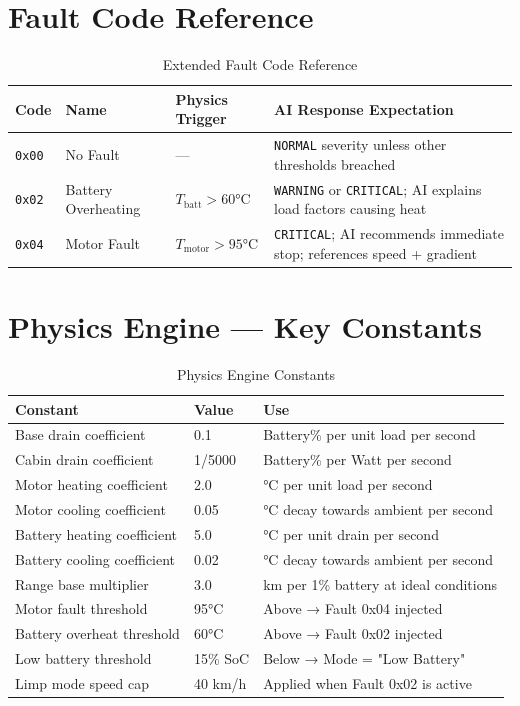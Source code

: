 \documentclass[12pt,a4paper]{report}
\begin{document}
\chapter{Fault Code Reference}

\begin{table}[H]
\centering
\caption{Extended Fault Code Reference}
\label{tab:faults-extended}
\begin{tabularx}{\textwidth}{C{2cm} L{3.5cm} L{3cm} X}
\toprule
\textbf{Code} & \textbf{Name} & \textbf{Physics Trigger} & \textbf{AI Response Expectation} \\
\midrule
\texttt{0x00} & No Fault & — & \texttt{NORMAL} severity unless other thresholds breached \\
\texttt{0x02} & Battery Overheating & $T_{\text{batt}} > 60$°C & \texttt{WARNING} or \texttt{CRITICAL}; AI explains load factors causing heat \\
\texttt{0x04} & Motor Fault & $T_{\text{motor}} > 95$°C & \texttt{CRITICAL}; AI recommends immediate stop; references speed + gradient \\
\bottomrule
\end{tabularx}
\end{table}

\chapter{Physics Engine — Key Constants}

\begin{table}[H]
\centering
\caption{Physics Engine Constants}
\label{tab:constants}
\begin{tabularx}{\textwidth}{L{4.5cm} C{3cm} X}
\toprule
\textbf{Constant} & \textbf{Value} & \textbf{Use} \\
\midrule
Base drain coefficient & 0.1 & Battery\% per unit load per second \\
Cabin drain coefficient & 1/5000 & Battery\% per Watt per second \\
Motor heating coefficient & 2.0 & °C per unit load per second \\
Motor cooling coefficient & 0.05 & °C decay towards ambient per second \\
Battery heating coefficient & 5.0 & °C per unit drain per second \\
Battery cooling coefficient & 0.02 & °C decay towards ambient per second \\
Range base multiplier & 3.0 & km per 1\% battery at ideal conditions \\
Motor fault threshold & 95°C & Above → Fault 0x04 injected \\
Battery overheat threshold & 60°C & Above → Fault 0x02 injected \\
Low battery threshold & 15\% SoC & Below → Mode = "Low Battery" \\
Limp mode speed cap & 40 km/h & Applied when Fault 0x02 is active \\
\bottomrule
\end{tabularx}
\end{table}
\end{document}
